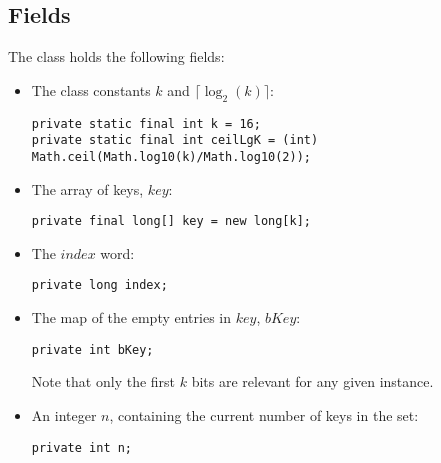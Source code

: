 \subsection{Fields} \label{sec:binaryRankFields}
The class holds the following fields:
\begin{itemize}
    \item
    The class constants $k$ and $\lceil \log_2(k) \rceil$:
    \begin{lstlisting}
private static final int k = 16;
private static final int ceilLgK = (int) Math.ceil(Math.log10(k)/Math.log10(2));
    \end{lstlisting}

    \item
    The array of keys, $key$:
    \begin{lstlisting}
private final long[] key = new long[k];
    \end{lstlisting}
    
    \item
    The $index$ word:
    \begin{lstlisting}
private long index;
    \end{lstlisting}

    \item
    The map of the empty entries in $key$, $bKey$:
    \begin{lstlisting}
private int bKey;
    \end{lstlisting}
    Note that only the first $k$ bits are relevant for any given instance.
    
    \item
    An integer $n$, containing the current number of keys in the set:
    \begin{lstlisting}
private int n;
    \end{lstlisting}
\end{itemize}

